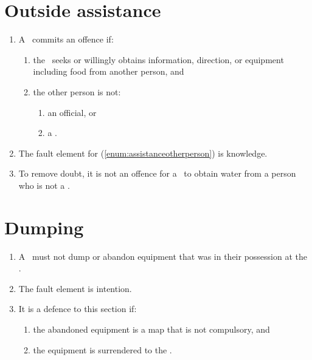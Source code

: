 \documentclass[12pt]{report}
\begin{document}
  \section{Outside assistance}
  \begin{enumerate}
    \item A \team\ commits an offence if:
    \begin{enumerate}
      \item the \team\ seeks or willingly obtains information, direction, or equipment including food from another person, and
      \item the other person is not: \label{enum:assistanceotherperson}
      \begin{enumerate}
      \item  an official, or
      \item  a \competitor.
      \end{enumerate}
    \end{enumerate}

        \item The fault element for \thesection(\ref{enum:assistanceotherperson}) is knowledge.
    \item To remove doubt, it is not an offence for a  \competitor\ to obtain water from a person who is not a \spectator.
  \end{enumerate}
  \section{Dumping}
  \begin{enumerate}
    \item A \team\ must not dump or abandon equipment that was in their possession at the \scrutineeringarea.

    \item The fault element is intention.
    \item It is a defence to this section if:
    \begin{enumerate}
      \item the abandoned equipment is a map that is not compulsory, and
      \item the equipment is surrendered to the \LeadDriver.
    \end{enumerate}
  \end{enumerate}
\end{document}
